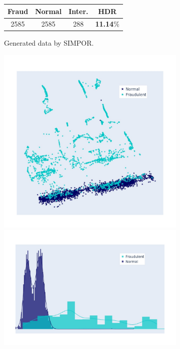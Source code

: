 \begin{figure}[h!]
\begin{subfigure}[]{0.3\linewidth}
\begin{tabular}{c|c|c|c}
			Fraud & Normal & Inter. & HDR  \\
			\hline
			2585  & 2585  & 288 & \textbf{11.14\(\%\)} \\
		\end{tabular}
		\caption{Generated data by SIMPOR. }
		\label{fig:SIMPOR_hist}
	\end{subfigure}
	\hspace{0.1em}%
	\begin{subfigure}[]{0.3\linewidth}	
		\includegraphics[width=\linewidth,trim=40 40 40 40,clip]{Figures/creditcard/PCA/SMOTE-data-run-0-0}
		\includegraphics[width=\linewidth,trim=40 40 40 40,clip]{Figures/creditcard/PCA/SMOTE-data-run-0-0_DIST}

\end{subfigure}
\end{figure}
